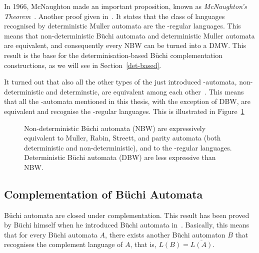 In 1966, McNaughton made an important proposition, known as \emph{McNaughton's Theorem}~\cite{McNaughton1966}. Another proof given in~\cite{Thomas:1991}. It states that the class of languages recognised by deterministic Muller automata are the \om-regular languages. This means that non-deterministic Büchi automata and deterministic Muller automata are equivalent, and consequently every NBW can be turned into a DMW. This result is the base for the determinisation-based Büchi complementation constructions, as we will see in Section~\ref{det-based}.

It turned out that also all the other types of the just introduced \om-automata, non-deterministic and determinstic, are equivalent among each other~\cite{2002_roggenbach}\cite{2006_klein}\cite{klein2005linear}\cite{1999_loeding}\cite{Thomas:1991}. This means that all the \om-automata mentioned in this thesis, with the exception of DBW, are equivalent and recognise the \om-regular languages. This is illustrated in Figure~\ref{equivalences}






\begin{figure}[htb]
\begin{center}
\Equivalences
\caption{Non-deterministic Büchi automata (NBW) are expressively equivalent to Muller, Rabin, Streett, and parity automata (both deterministic and non-deterministic), and to the \om-regular languages. Deterministic Büchi automata (DBW) are less expressive than NBW.}
\label{equivalences}
\end{center}
\end{figure}


\subsection{Complementation of Büchi Automata}
\label{intro:complementation}
Büchi automata are closed under complementation. This result has been proved by Büchi himself when he introduced Büchi automata in~\cite{buchi1960decision}. Basically, this means that for every Büchi automata $A$, there exists another Büchi automaton $B$ that recognises the complement language of $A$, that is, $L(B) = \overline{L(A)}$.

